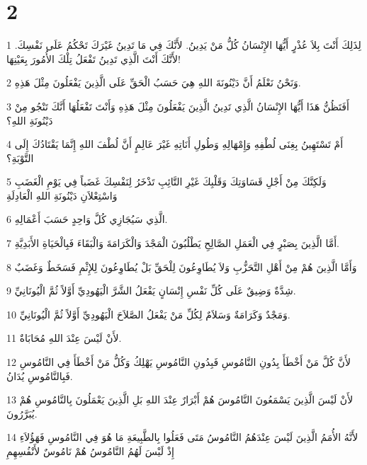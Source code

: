 \chapter{2}

\par 1 لِذَلِكَ أَنْتَ بِلاَ عُذْرٍ أَيُّهَا الإِنْسَانُ كُلُّ مَنْ يَدِينُ. لأَنَّكَ فِي مَا تَدِينُ غَيْرَكَ تَحْكُمُ عَلَى نَفْسِكَ. لأَنَّكَ أَنْتَ الَّذِي تَدِينُ تَفْعَلُ تِلْكَ الأُمُورَ بِعَيْنِهَا!
\par 2 وَنَحْنُ نَعْلَمُ أَنَّ دَيْنُونَةَ اللهِ هِيَ حَسَبُ الْحَقِّ عَلَى الَّذِينَ يَفْعَلُونَ مِثْلَ هَذِهِ.
\par 3 أَفَتَظُنُّ هَذَا أَيُّهَا الإِنْسَانُ الَّذِي تَدِينُ الَّذِينَ يَفْعَلُونَ مِثْلَ هَذِهِ وَأَنْتَ تَفْعَلُهَا أَنَّكَ تَنْجُو مِنْ دَيْنُونَةِ اللهِ؟
\par 4 أَمْ تَسْتَهِينُ بِغِنَى لُطْفِهِ وَإِمْهَالِهِ وَطُولِ أَنَاتِهِ غَيْرَ عَالِمٍ أَنَّ لُطْفَ اللهِ إِنَّمَا يَقْتَادُكَ إِلَى التَّوْبَةِ؟
\par 5 وَلَكِنَّكَ مِنْ أَجْلِ قَسَاوَتِكَ وَقَلْبِكَ غَيْرِ التَّائِبِ تَذْخَرُ لِنَفْسِكَ غَضَباً فِي يَوْمِ الْغَضَبِ وَاسْتِعْلاَنِ دَيْنُونَةِ اللهِ الْعَادِلَةِ
\par 6 الَّذِي سَيُجَازِي كُلَّ وَاحِدٍ حَسَبَ أَعْمَالِهِ.
\par 7 أَمَّا الَّذِينَ بِصَبْرٍ فِي الْعَمَلِ الصَّالِحِ يَطْلُبُونَ الْمَجْدَ وَالْكَرَامَةَ وَالْبَقَاءَ فَبِالْحَيَاةِ الأَبَدِيَّةِ.
\par 8 وَأَمَّا الَّذِينَ هُمْ مِنْ أَهْلِ التَّحَزُّبِ وَلاَ يُطَاوِعُونَ لِلْحَقِّ بَلْ يُطَاوِعُونَ لِلإِثْمِ فَسَخَطٌ وَغَضَبٌ
\par 9 شِدَّةٌ وَضِيقٌ عَلَى كُلِّ نَفْسِ إِنْسَانٍ يَفْعَلُ الشَّرَّ الْيَهُودِيِّ أَوَّلاً ثُمَّ الْيُونَانِيِّ.
\par 10 وَمَجْدٌ وَكَرَامَةٌ وَسَلاَمٌ لِكُلِّ مَنْ يَفْعَلُ الصَّلاَحَ الْيَهُودِيِّ أَوَّلاً ثُمَّ الْيُونَانِيِّ.
\par 11 لأَنْ لَيْسَ عِنْدَ اللهِ مُحَابَاةٌ.
\par 12 لأَنَّ كُلَّ مَنْ أَخْطَأَ بِدُونِ النَّامُوسِ فَبِدُونِ النَّامُوسِ يَهْلِكُ وَكُلُّ مَنْ أَخْطَأَ فِي النَّامُوسِ فَبِالنَّامُوسِ يُدَانُ.
\par 13 لأَنْ لَيْسَ الَّذِينَ يَسْمَعُونَ النَّامُوسَ هُمْ أَبْرَارٌ عِنْدَ اللهِ بَلِ الَّذِينَ يَعْمَلُونَ بِالنَّامُوسِ هُمْ يُبَرَّرُونَ.
\par 14 لأَنَّهُ الأُمَمُ الَّذِينَ لَيْسَ عِنْدَهُمُ النَّامُوسُ مَتَى فَعَلُوا بِالطَّبِيعَةِ مَا هُوَ فِي النَّامُوسِ فَهَؤُلاَءِ إِذْ لَيْسَ لَهُمُ النَّامُوسُ هُمْ نَامُوسٌ لأَنْفُسِهِمِ
